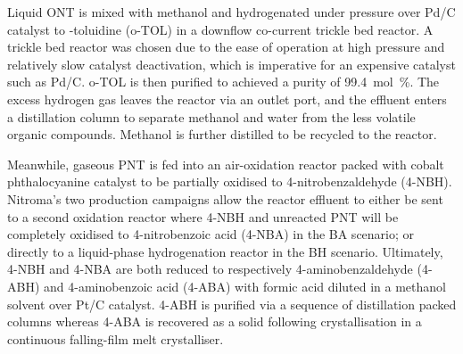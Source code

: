 Liquid ONT is mixed with methanol and hydrogenated under pressure over Pd/C catalyst to \ortho-toluidine (o-TOL) in a downflow co-current trickle bed reactor. A trickle bed reactor was chosen due to the ease of operation at high pressure and relatively slow catalyst deactivation, which is imperative for an expensive catalyst such as Pd/C. o-TOL is then purified to achieved a purity of \SI{99.4}{mol\percent}. The excess hydrogen gas leaves the reactor via an outlet port, and the effluent enters a distillation column to separate methanol and water from the less volatile organic compounds. Methanol is further distilled to be recycled to the reactor. 


Meanwhile, gaseous PNT is fed into an air-oxidation reactor packed with cobalt phthalocyanine catalyst to be partially oxidised to 4-nitrobenzaldehyde (4-NBH). Nitroma's two production campaigns allow the reactor effluent to either be sent to a second oxidation reactor where 4-NBH and unreacted PNT will be completely oxidised to 4-nitrobenzoic acid (4-NBA) in the BA scenario; or directly to a liquid-phase hydrogenation reactor in the BH scenario. Ultimately, 4-NBH and 4-NBA are both reduced to respectively 4-aminobenzaldehyde (4-ABH) and 4-aminobenzoic acid (4-ABA) with formic acid diluted in a methanol solvent over Pt/C catalyst. 4-ABH is purified via a sequence of distillation packed columns whereas 4-ABA is recovered as a solid following  crystallisation in a continuous falling-film melt crystalliser.








 

